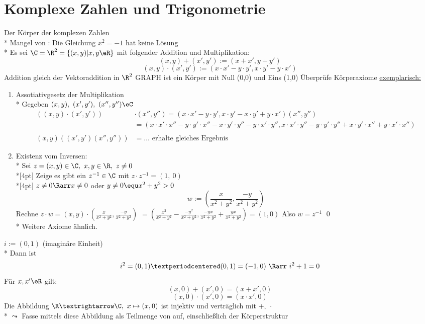 \chapter{Komplexe Zahlen und Trigonometrie}
Der Körper \C{} der komplexen Zahlen\\*
Mangel von \R{}: Die Gleichung $x^2=-1$ hat keine Lösung\\*
Es sei $\C=\R^2=\{(x,y)|x,y\eR\}$ mit folgender Addition und Multiplikation:
$$(x,y)+(x',y'):=(x+x',y+y')$$
$$(x,y)·(x',y'):=(x·x'-y·y',x·y'-y·x')$$
Addition gleich der Vektoraddition in $\R^2$ GRAPH
\C{} ist ein Körper mit Null (0,0) und Eins (1,0)
\bew
Überprüfe Körperaxiome \ul{exemplarisch:}
\begin{enumerate}
\item{Assotiativgesetz der Multiplikation\\*
Gegeben $(x,y),\ (x',y'),\ (x'',y'')\eC$
\begin{align*}
((x,y)·(x',y'))&·(x'',y'')=(x·x'-y·y',x·y'-x·y'+y·x')(x'',y'')\\
&=(x·x'·x''-y·y'·x''-x·y'·y''-y·x'·y'',x·x'·y''-y·y'·y''+x·y'·x''+y·x'·x'')\\ \\
(x,y)((x',y')(x'',y''))&=…\text{ erhalte gleiches Ergebnis}
\end{align*}}
\item{Existenz vom Inversen:\\*
Sei $z = (x, y) \in \C, \ x, y \in \R, \ z \neq 0$ \\*[4pt]
Zeige es gibt ein $z^{-1} \in \C$ mit $z \cdot z^{-1} = (1,\ 0)$\\*[4pt]
$z \neq 0 \Rarr x \neq 0$ oder $y \neq 0 \equ x^2 + y^2 > 0$
$$w:= \left(\frac{x}{x^2 + y^2}, \frac{-y}{x^2 + y^2}\right)$$
Rechne $z \cdot w = (x, y) \cdot \left(\frac{x}{x^2 + y^2}, \frac{-y}{x^2 + y^2}\right)$
$=\left(\frac{x^2}{x^2 + y^2} - \frac{-y^2}{x^2 + y^2}, \frac{-yx}{x^2 + y^2} + \frac{yx}{x^2 + y^2}\right) = (1, 0)$
Also $w = z^{-1}$ \qed \\*
Weitere Axiome ähnlich.}
\end{enumerate}
$i:=(0,1)$ (imaginäre Einheit)\\*
Dann ist $$i^2=(0,1)·(0,1)=(-1,0)\ \Rarr\ i^2+1=0$$
\bem
Für $x,x'\eR$ gilt:
$$(x,0)+(x',0)=(x+x',0)$$
$$(x,0)·(x',0)=(x·x',0)$$
Die Abbildung $\R→\C,\ x\mapsto(x,0)$ ist injektiv und verträglich mit $+,\ ·$\\*
$\leadsto$ Fasse \R{} mittels diese Abbildung als Teilmenge von \C{} auf, einschließlich der Körperstruktur\\
